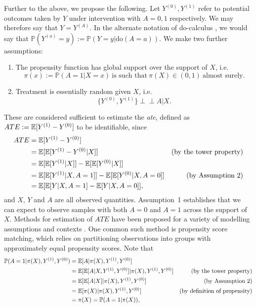 \documentclass[../thesis.tex]{subfiles}
\begin{document}
Further to the above, we propose the following. Let $Y^{(0)}, Y^{(1)}$ refer to potential outcomes taken by $Y$ under intervention with $A=0,1$
respectively. We may therefore say that $Y=Y^{(A)}$. In the alternate notation of do-calculus \citep{pearl_causal_1995, pearl_-calculus_2012}, we would say that $\mathbb{P}(Y^{(a)} = y) := \mathbb{P}(Y = y |  \text{do}(A=a))$. We make two further assumptions: 
\begin{enumerate}
    \item The propensity function has global support over the support of $X$, i.e. 
    \[\pi(x) := \mathbb{P}(A=1 | X = x) \  \text{is such that} \ \pi(X) \in (0,1) \ \text{almost surely.}\]
    \item Treatment is essentially random given $X$, i.e.
    \[\{Y^{(0)}, Y^{(1)}\} \perp\!\!\!\perp A | X. \]
\end{enumerate}
These are considered sufficient to estimate the \emph{\gls{ate}}, defined as $ATE := \mathbb{E}[Y^{(1)} -Y^{(0)}]$ to be identifiable, since 
\begin{align*}
    ATE & = \mathbb{E}[Y^{(1)} - Y^{(0)} ] & \\
    & = \mathbb{E}[\mathbb{E}[Y^{(1)} - Y^{(0)} | X]] & \text{(by the tower property)} \\
    & = \mathbb{E}[\mathbb{E}[Y^{(1)} | X]] - \mathbb{E}[\mathbb{E}[Y^{(0)} | X]] & \\ 
    & = \mathbb{E}[\mathbb{E}[Y^{(1)} | X, A = 1]] - \mathbb{E}[\mathbb{E}[Y^{(0)} | X, A = 0]] & \text{(by Assumption~2)} \\
    & = \mathbb{E}[\mathbb{E}[Y | X, A = 1] - \mathbb{E}[Y | X, A = 0]], & \label{eq:ate}
\end{align*}
and $X$, $Y$ and $A$ are all observed quantities. Assumption~1 establishes that we can expect to observe samples with both $A=0$ and $A=1$ across the support of $X$. Methods for estimation of $ATE$ have been proposed for a variety of modelling assumptions and contexts \citep{reiersol_confluence_1945, thistlethwaite_regression-discontinuity_1960, rosenbaum_central_1983, abadie_semiparametric_2005, craig_natural_2017, roth_whats_2023}. One common such method is propensity score matching, which relies on partitioning observations into groups with approximately equal propensity scores. Note that 
\begin{align*}
    \mathbb{P}(A=1 | \pi(X), Y^{(1)}, Y^{(0)}) & = \mathbb{E}[A | \pi(X), Y^{(1)}, Y^{(0)}] & \\
    & = \mathbb{E}[\mathbb{E}[A | X, Y^{(1)}, Y^{(0)}] | \pi(X), Y^{(1)}, Y^{(0)}] & \text{(by the tower property)}\\
    & = \mathbb{E}[\mathbb{E}[A|X]|\pi(X), Y^{(1)}, Y^{(0)}] & \text{(by Assumption~2)} \\
    & = \mathbb{E}[\pi(X) | \pi(X), Y^{(1)}, Y^{(0)}] & \text{(by definition of propensity)} \\
    & = \pi(X) = \mathbb{P}(A=1|\pi(X)), &
\end{align*}
\end{document}
